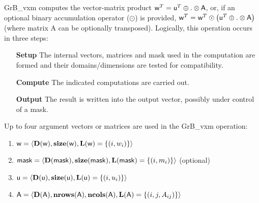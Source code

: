 {\sf GrB\_vxm} computes the vector-matrix product ${\sf w}^T = {\sf
u}^T \oplus . \otimes {\sf A}$, or, if an optional binary accumulation
operator ($\odot$) is provided, ${\sf w}^T = {\sf w}^T \odot
\left({\sf u}^T \oplus . \otimes {\sf A}\right)$ (where matrix {\sf A}
 can be optionally transposed).  Logically, this operation
occurs in three steps:
\begin{enumerate}[leftmargin=0.85in]
\item[\bf Setup] The internal vectors, matrices and mask used in the computation are formed and their domains/dimensions are tested for compatibility.
\item[\bf Compute] The indicated computations are carried out.
\item[\bf Output] The result is written into the output vector, possibly under control of a mask.
\end{enumerate}

Up to four argument vectors or matrices are used in the {\sf GrB\_vxm} operation:
\begin{enumerate}
	\item ${\sf w} = \langle \bold{D}({\sf w}),\bold{size}({\sf w}),\bold{L}({\sf w}) = \{(i,w_i) \} \rangle$
	\item ${\sf mask} = \langle \bold{D}({\sf mask}),\bold{size}({\sf mask}),\bold{L}({\sf mask}) = \{(i,m_i) \} \rangle$ (optional)
	\item ${\sf u} = \langle \bold{D}({\sf u}),\bold{size}({\sf u}),\bold{L}({\sf u}) = \{(i,u_i) \} \rangle$
	\item ${\sf A} = \langle \bold{D}({\sf A}),\bold{nrows}({\sf A}), \bold{ncols}({\sf A}),\bold{L}({\sf A}) = \{(i,j,A_{ij}) \} \rangle$
\end{enumerate}

